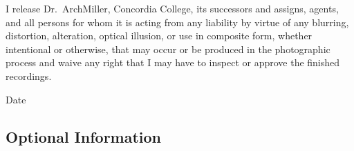 \documentclass{tufte-handout}
\begin{document}
I release Dr.~ArchMiller, Concordia College, its successors and assigns, agents, and all persons for whom it is acting from any liability by virtue of any blurring, distortion, alteration, optical illusion, or use in composite form, whether intentional or otherwise, that may occur or be produced in the photographic process and waive any right that I may have to inspect or approve the finished recordings.

  \hrulefill
{}  \underline{\hspace{5cm}} {Date}  \hrulefill

\subsection{Optional Information}

 \hrulefill

 \hrulefill

 \hrulefill

 \hrulefill


 \hrulefill

\hrulefill

\hrulefill

\hrulefill

\hrulefill

\hrulefill
\end{document}
